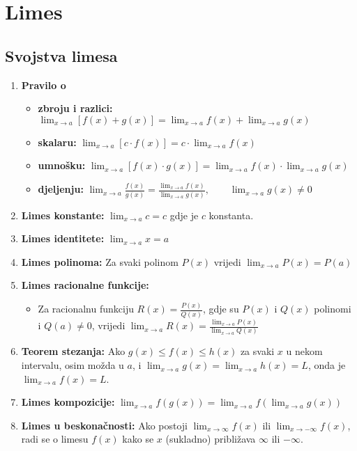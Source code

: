\section{Limes}

\subsection{Svojstva limesa}

\begin{enumerate}
    \item \textbf{Pravilo o}
    \begin{itemize}
        \item \textbf{zbroju i razlici:} $\lim_{x \to a} [f(x) + g(x)] = \lim_{x \to a} f(x) + \lim_{x \to a} g(x)$
        \item \textbf{skalaru:} $\lim_{x \to a} [c \cdot f(x)] = c \cdot \lim_{x \to a} f(x)$
        \item \textbf{umnošku:} $\lim_{x \to a} [f(x) \cdot g(x)] = \lim_{x \to a} f(x) \cdot \lim_{x \to a} g(x)$
        \item \textbf{djeljenju:} $\lim_{x \to a} \frac{f(x)}{g(x)} = \frac{\lim_{x \to a} f(x)}{\lim_{x \to a} g(x)},\qquad \lim_{x \to a} g(x) \neq 0$
    \end{itemize}
    
    \item \textbf{Limes konstante:} $\lim_{x \to a} c = c$ gdje je $c$ konstanta.
    
    \item \textbf{Limes identitete:} $\lim_{x \to a} x = a$
    
    \item \textbf{Limes polinoma:} Za svaki polinom $P(x)$ vrijedi $\lim_{x \to a} P(x) = P(a)$
    
    \item \textbf{Limes racionalne funkcije:} 
    \begin{itemize}
        \item Za racionalnu funkciju $R(x) = \frac{P(x)}{Q(x)}$, gdje su $P(x)$ i $Q(x)$ polinomi i $Q(a) \neq 0$, vrijedi
              $\lim_{x \to a} R(x) = \frac{\lim_{x \to a} P(x)}{\lim_{x \to a} Q(x)}$
    \end{itemize}
    
    \item \textbf{Teorem stezanja:} Ako $g(x) \leq f(x) \leq h(x)$ za svaki $x$ u nekom intervalu, osim možda u $a$, i $\lim_{x \to a} g(x) = \lim_{x \to a} h(x) = L$, onda je $\lim_{x \to a} f(x) = L$.
    
    \item \textbf{Limes kompozicije:} $\lim_{x \to a} f(g(x)) = \lim_{x \to a} f(\lim_{x \to a} g(x))$
    
    \item \textbf{Limes u beskonačnosti:} Ako postoji $\lim_{x \to \infty} f(x)$ ili $\lim_{x \to -\infty} f(x)$, radi se o limesu $f(x)$ kako se $x$ (sukladno) približava $\infty$ ili $-\infty$.
\end{enumerate}